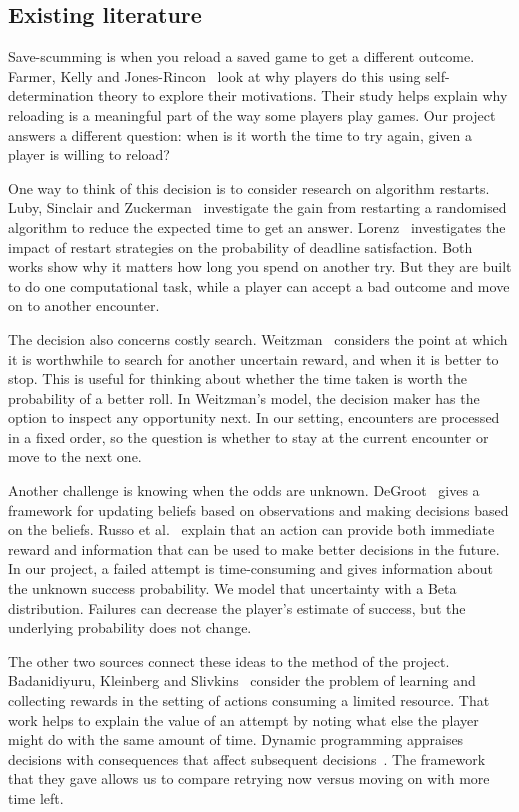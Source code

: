 \documentclass[11pt,a4paper]{article}
\begin{document}
\subsection{Existing literature}
Save-scumming is when you reload a saved game to get a different outcome. Farmer, Kelly and Jones-Rincon~\cite{farmer2025} look at why players do this using self-determination theory to explore their motivations. Their study helps explain why reloading is a meaningful part of the way some players play games. Our project answers a different question: when is it worth the time to try again, given a player is willing to reload?

One way to think of this decision is to consider research on algorithm restarts. Luby, Sinclair and Zuckerman~\cite{luby1993} investigate the gain from restarting a randomised algorithm to reduce the expected time to get an answer. Lorenz~\cite{lorenz2016} investigates the impact of restart strategies on the probability of deadline satisfaction. Both works show why it matters how long you spend on another try. But they are built to do one computational task, while a player can accept a bad outcome and move on to another encounter.

The decision also concerns costly search. Weitzman~\cite{weitzman1979} considers the point at which it is worthwhile to search for another uncertain reward, and when it is better to stop. This is useful for thinking about whether the time taken is worth the probability of a better roll. In Weitzman's model, the decision maker has the option to inspect any opportunity next. In our setting, encounters are processed in a fixed order, so the question is whether to stay at the current encounter or move to the next one.

Another challenge is knowing when the odds are unknown. DeGroot~\cite{degroot2004} gives a framework for updating beliefs based on observations and making decisions based on the beliefs. Russo et al.~\cite{russo2018} explain that an action can provide both immediate reward and information that can be used to make better decisions in the future. In our project, a failed attempt is time-consuming and gives information about the unknown success probability. We model that uncertainty with a Beta distribution. Failures can decrease the player's estimate of success, but the underlying probability does not change.

The other two sources connect these ideas to the method of the project. Badanidiyuru, Kleinberg and Slivkins~\cite{badanidiyuru2018} consider the problem of learning and collecting rewards in the setting of actions consuming a limited resource. That work helps to explain the value of an attempt by noting what else the player might do with the same amount of time. Dynamic programming appraises decisions with consequences that affect subsequent decisions~\cite{sargent2025}. The framework that they gave allows us to compare retrying now versus moving on with more time left.
\end{document}
